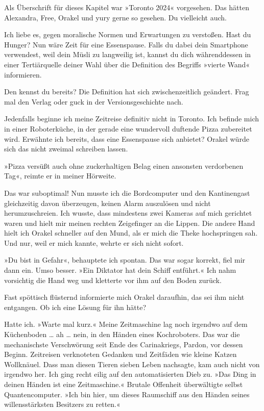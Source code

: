 Als Überschrift für dieses Kapitel war »Toronto 2024« vorgesehen. Das hätten Alexandra, Free, Orakel und yury gerne so gesehen. Du vielleicht auch.

Ich liebe es, gegen moralische Normen und Erwartungen zu verstoßen. Hast du Hunger? Nun wäre Zeit für eine Essenspause. Falls du dabei dein Smartphone verwendest, weil dein Müsli zu langweilig ist, kannst du dich währenddessen in einer Tertiärquelle deiner Wahl über die Definition des Begriffs »vierte Wand« informieren.

Den kennst du bereits? Die Definition hat sich zwischenzeitlich geändert. Frag mal den Verlag oder guck in der Versionsgeschichte nach.

Jedenfalls beginne ich meine Zeitreise definitiv nicht in Toronto. Ich befinde mich in einer Roboterküche, in der gerade eine wundervoll duftende Pizza zubereitet wird. Erwähnte ich bereits, dass eine Essenspause sich anbietet? Orakel würde sich das nicht zweimal schreiben lassen.

»Pizza versüßt auch ohne zuckerhaltigen Belag einen ansonsten verdorbenen Tag«, reimte er in meiner Hörweite.

Das war suboptimal! Nun musste ich die Bordcomputer und den Kantinengast gleichzeitig davon überzeugen, keinen Alarm auszulösen und nicht herumzuschreien. Ich wusste, dass mindestens zwei Kameras auf mich gerichtet waren und hielt mir meinen rechten Zeigefinger an die Lippen. Die andere Hand hielt ich Orakel schneller auf den Mund, als er mich die Theke hochspringen sah. Und nur, weil er mich kannte, wehrte er sich nicht sofort.

»Du bist in Gefahr«, behauptete ich spontan. Das war sogar korrekt, fiel mir dann ein. Umso besser. »Ein Diktator hat dein Schiff entführt.« Ich nahm vorsichtig die Hand weg und kletterte vor ihm auf den Boden zurück.

Fast spöttisch flüsternd informierte mich Orakel daraufhin, das sei ihm nicht entgangen. Ob ich eine Lösung für ihn hätte?

Hatte ich. »Warte mal kurz.« Meine Zeitmaschine lag noch irgendwo auf dem Küchenboden … ah … nein, in den Händen eines Kochroboters. Das war die mechanischste Verschwörung seit Ende des Carinakriegs, Pardon, vor dessen Beginn. Zeitreisen verknoteten Gedanken und Zeitfäden wie kleine Katzen Wollknäuel. Dass man diesen Tieren sieben Leben nachsagte, kam auch nicht von irgendwo her. Ich ging recht eilig auf den automatisierten Dieb zu. »Das Ding in deinen Händen ist eine Zeitmaschine.« Brutale Offenheit überwältigte selbst Quantencomputer. »Ich bin hier, um dieses Raumschiff aus den Händen seines willensstärksten Besitzers zu retten.«

